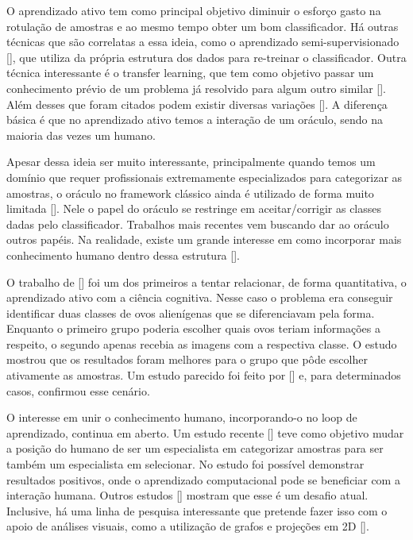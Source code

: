 O aprendizado ativo tem como principal objetivo diminuir o esforço gasto na rotulação de amostras e ao mesmo tempo obter um bom classificador. Há outras técnicas que são correlatas a essa ideia, como o aprendizado semi-supervisionado [\cite{zhu2006semi}], que utiliza da própria estrutura dos dados para re-treinar o classificador. Outra técnica interessante é o transfer learning, que tem como objetivo passar um conhecimento prévio de um problema já resolvido para algum outro similar []. Além desses que foram citados podem existir diversas variações []. A diferença básica é que no aprendizado ativo temos a interação de um oráculo, sendo na maioria das vezes um humano. 


Apesar dessa ideia ser muito interessante, principalmente quando temos um domínio que requer profissionais extremamente especializados para categorizar as amostras, o oráculo no framework clássico ainda é utilizado de forma muito limitada [\cite{seifert2010user}]. Nele o papel do oráculo se restringe em aceitar/corrigir as classes dadas pelo classificador. Trabalhos mais recentes vem buscando dar ao oráculo outros papéis. Na realidade, existe um grande interesse em como incorporar mais conhecimento humano dentro dessa estrutura [\cite{settles2014active}]. 

O trabalho de [\cite{castro2009human}] foi um dos primeiros a tentar relacionar, de forma quantitativa, o aprendizado ativo com a ciência cognitiva. Nesse caso o problema era conseguir identificar duas classes de ovos alienígenas que se diferenciavam pela forma. Enquanto o primeiro grupo poderia escolher quais ovos teriam informações a respeito, o segundo apenas recebia as imagens com a respectiva classe. O estudo mostrou que os resultados foram melhores para o grupo que pôde escolher ativamente as amostras. Um estudo parecido foi feito por [\cite{markant2014better}] e, para determinados casos, confirmou esse cenário. 

O interesse em unir o conhecimento humano, incorporando-o no loop de aprendizado, continua em aberto. Um estudo recente [\cite{kottke2018other}] teve como objetivo mudar a posição do humano de ser um especialista em categorizar amostras para ser também um especialista em selecionar. No estudo foi possível demonstrar resultados positivos, onde o aprendizado computacional pode se beneficiar com a interação humana. Outros estudos [\cite{calma2016active}] mostram que esse é um desafio atual. Inclusive, há uma linha de pesquisa interessante que pretende fazer isso com o apoio de análises visuais, como a utilização de grafos e projeções em 2D [\cite{yang2018visually, bernard2018comparing, weigl2016mapview}].


